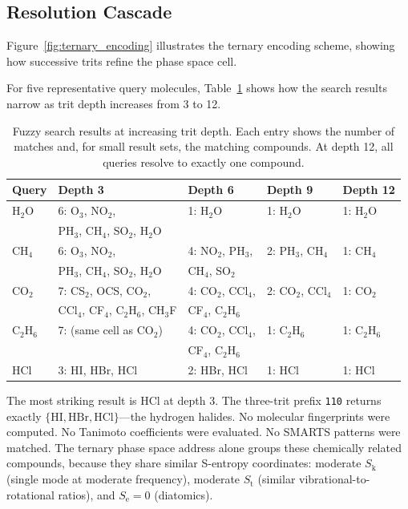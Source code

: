 \documentclass[11pt,twocolumn,a4paper]{article}
\theoremstyle{definition}
\theoremstyle{remark}
\newcommand{\Sk}{S_{\mathrm{k}}}
\newcommand{\St}{S_{\mathrm{t}}}
\newcommand{\Se}{S_{\mathrm{e}}}
\begin{document}
\subsection{Resolution Cascade}

Figure~\ref{fig:ternary_encoding} illustrates the ternary encoding scheme, showing how successive trits refine the phase space cell.



For five representative query molecules, Table~\ref{tab:fuzzy_cascade} shows how the search results narrow as trit depth increases from 3 to 12.

\begin{table}[H]
\centering
\caption{Fuzzy search results at increasing trit depth. Each entry shows the number of matches and, for small result sets, the matching compounds. At depth 12, all queries resolve to exactly one compound.}
\label{tab:fuzzy_cascade}
\begin{tabular}{lllll}
\toprule
Query & Depth 3 & Depth 6 & Depth 9 & Depth 12 \\
\midrule
H$_2$O & 6: O$_3$, NO$_2$, & 1: H$_2$O & 1: H$_2$O & 1: H$_2$O \\
       & PH$_3$, CH$_4$, SO$_2$, H$_2$O & & & \\[3pt]
CH$_4$ & 6: O$_3$, NO$_2$, & 4: NO$_2$, PH$_3$, & 2: PH$_3$, CH$_4$ & 1: CH$_4$ \\
       & PH$_3$, CH$_4$, SO$_2$, H$_2$O & CH$_4$, SO$_2$ & & \\[3pt]
CO$_2$ & 7: CS$_2$, OCS, CO$_2$, & 4: CO$_2$, CCl$_4$, & 2: CO$_2$, CCl$_4$ & 1: CO$_2$ \\
       & CCl$_4$, CF$_4$, C$_2$H$_6$, CH$_3$F & CF$_4$, C$_2$H$_6$ & & \\[3pt]
C$_2$H$_6$ & 7: (same cell as CO$_2$) & 4: CO$_2$, CCl$_4$, & 1: C$_2$H$_6$ & 1: C$_2$H$_6$ \\
       & & CF$_4$, C$_2$H$_6$ & & \\[3pt]
HCl    & 3: HI, HBr, HCl & 2: HBr, HCl & 1: HCl & 1: HCl \\
\bottomrule
\end{tabular}
\end{table}

The most striking result is HCl at depth 3. The three-trit prefix \texttt{110} returns exactly $\{\text{HI}, \text{HBr}, \text{HCl}\}$---the hydrogen halides. No molecular fingerprints were computed. No Tanimoto coefficients were evaluated. No SMARTS patterns were matched. The ternary phase space address alone groups these chemically related compounds, because they share similar S-entropy coordinates: moderate $\Sk$ (single mode at moderate frequency), moderate $\St$ (similar vibrational-to-rotational ratios), and $\Se = 0$ (diatomics).
\end{document}
